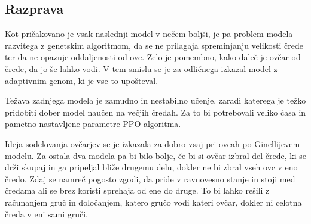 \subsection{Razprava}

Kot pričakovano je vsak naslednji model v nečem boljši, je pa problem modela razvitega z genetskim algoritmom, da se ne prilagaja spreminjanju velikosti črede ter da ne opazuje oddaljenosti od ovc. Zelo je pomembno, kako daleč je ovčar od črede, da jo še lahko vodi. V tem smislu se je za odličnega izkazal model z adaptivnim genom, ki je vse to upošteval.

Težava zadnjega modela je zamudno in nestabilno učenje, zaradi katerega je težko pridobiti dober model naučen na večjih čredah. Za to bi potrebovali veliko časa in pametno nastavljene parametre PPO algoritma.

Ideja sodelovanja ovčarjev se je izkazala za dobro vsaj pri ovcah po Ginellijevem modelu. Za ostala dva modela pa bi bilo bolje, če bi si ovčar izbral del črede, ki se drži skupaj in ga pripeljal bliže drugemu delu, dokler ne bi zbral vseh ovc v eno čredo. Zdaj se namreč pogosto zgodi, da pride v ravnovesno stanje in stoji med čredama ali se brez koristi sprehaja od ene do druge. To bi lahko rešili z računanjem gruč in določanjem, katero gručo vodi kateri ovčar, dokler ni celotna čreda v eni sami gruči.

